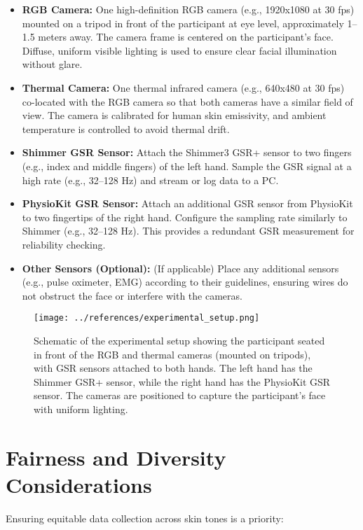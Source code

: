 \documentclass{article}
\begin{document}
\begin{itemize}
    \item \textbf{RGB Camera:} One high-definition RGB camera (e.g., 1920x1080 at 30 fps) mounted on a tripod in front of the participant at eye level, approximately 1–1.5 meters away. The camera frame is centered on the participant's face. Diffuse, uniform visible lighting is used to ensure clear facial illumination without glare.
    \item \textbf{Thermal Camera:} One thermal infrared camera (e.g., 640x480 at 30 fps) co-located with the RGB camera so that both cameras have a similar field of view. The camera is calibrated for human skin emissivity, and ambient temperature is controlled to avoid thermal drift.
    \item \textbf{Shimmer GSR Sensor:} Attach the Shimmer3 GSR+ sensor to two fingers (e.g., index and middle fingers) of the left hand. Sample the GSR signal at a high rate (e.g., 32–128 Hz) and stream or log data to a PC.
    \item \textbf{PhysioKit GSR Sensor:} Attach an additional GSR sensor from PhysioKit to two fingertips of the right hand. Configure the sampling rate similarly to Shimmer (e.g., 32–128 Hz). This provides a redundant GSR measurement for reliability checking.
    \item \textbf{Other Sensors (Optional):} (If applicable) Place any additional sensors (e.g., pulse oximeter, EMG) according to their guidelines, ensuring wires do not obstruct the face or interfere with the cameras.
\end{itemize}

\begin{figure}[h]
    \centering
    \texttt{[image: ../references/experimental\_setup.png]}
    \caption{Schematic of the experimental setup showing the participant seated in front of the RGB and thermal cameras (mounted on tripods), with GSR sensors attached to both hands. The left hand has the Shimmer GSR+ sensor, while the right hand has the PhysioKit GSR sensor. The cameras are positioned to capture the participant's face with uniform lighting.}
\end{figure}

\section{Fairness and Diversity Considerations}

Ensuring equitable data collection across skin tones is a priority:
\end{document}
